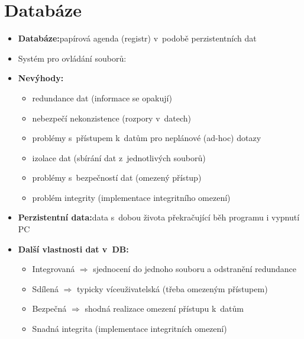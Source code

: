 \documentclass[a4paper,10pt]{article}
\newcommand{\pojem}[2]{\item \textbf{#1:}\quad #2}
\newcommand{\tedy}{$\Rightarrow$ }
\begin{document}
  \section{Databáze}
    \begin{itemize}
      \pojem{Databáze}{papírová agenda (registr) v~podobě perzistentních dat}
      \item Systém pro ovládání souborů:
      \pojem{Nevýhody}
      \begin{itemize}
        \item redundance dat (informace se opakují)
        \item nebezpečí nekonzistence (rozpory v~datech)
        \item problémy s~přístupem k~datům pro neplánové (ad-hoc) dotazy
        \item izolace dat (sbírání dat z~jednotlivých souborů)
        \item problémy s~bezpečností dat (omezený přístup)
        \item problém integrity (implementace integritního omezení)
      \end{itemize}

      \pojem{Perzistentní data}{data s~dobou života překračující běh programu i vypnutí PC}
      \pojem{Další vlastnosti dat v~DB}
      \begin{itemize}
        \item Integrovaná \tedy sjednocení do jednoho souboru a odstranění redundance
        \item Sdílená \tedy typicky víceuživatelská (třeba omezeným přístupem)
        \item Bezpečná \tedy shodná realizace omezení přístupu k~datům
        \item Snadná integrita (implementace integritních omezení)
      \end{itemize}


\end{itemize}
\end{document}
